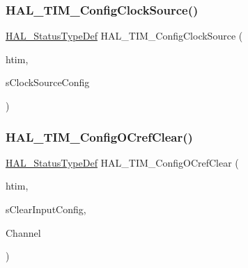 \subsubsection{\texorpdfstring{H\+A\+L\+\_\+\+T\+I\+M\+\_\+\+Config\+Clock\+Source()}{HAL\_TIM\_ConfigClockSource()}}
{\footnotesize\ttfamily \hyperlink{stm32f4xx__hal__def_8h_a63c0679d1cb8b8c684fbb0632743478f}{H\+A\+L\+\_\+\+Status\+Type\+Def} H\+A\+L\+\_\+\+T\+I\+M\+\_\+\+Config\+Clock\+Source (\begin{DoxyParamCaption}\item[{\hyperlink{struct_t_i_m___handle_type_def}{T\+I\+M\+\_\+\+Handle\+Type\+Def} $\ast$}]{htim,  }\item[{\hyperlink{struct_t_i_m___clock_config_type_def}{T\+I\+M\+\_\+\+Clock\+Config\+Type\+Def} $\ast$}]{s\+Clock\+Source\+Config }\end{DoxyParamCaption})}

\mbox{\label{group___t_i_m___exported___functions___group8_ga0b960485369b4ebb1e5d41e5e9e49770}} 
\subsubsection{\texorpdfstring{H\+A\+L\+\_\+\+T\+I\+M\+\_\+\+Config\+O\+Cref\+Clear()}{HAL\_TIM\_ConfigOCrefClear()}}
{\footnotesize\ttfamily \hyperlink{stm32f4xx__hal__def_8h_a63c0679d1cb8b8c684fbb0632743478f}{H\+A\+L\+\_\+\+Status\+Type\+Def} H\+A\+L\+\_\+\+T\+I\+M\+\_\+\+Config\+O\+Cref\+Clear (\begin{DoxyParamCaption}\item[{\hyperlink{struct_t_i_m___handle_type_def}{T\+I\+M\+\_\+\+Handle\+Type\+Def} $\ast$}]{htim,  }\item[{\hyperlink{struct_t_i_m___clear_input_config_type_def}{T\+I\+M\+\_\+\+Clear\+Input\+Config\+Type\+Def} $\ast$}]{s\+Clear\+Input\+Config,  }\item[{uint32\+\_\+t}]{Channel }\end{DoxyParamCaption})}

\mbox{\label{group___t_i_m___exported___functions___group8_ga7dfab2adafd2f2e315a9531f1150c201}} 
